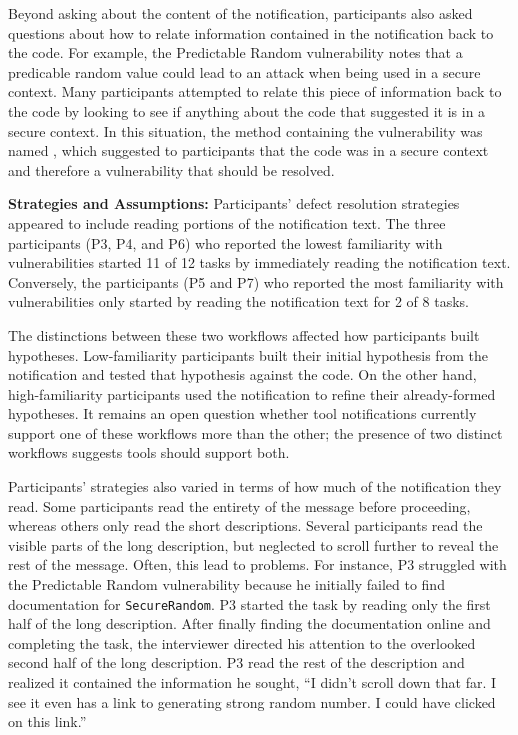 \documentclass[10pt,journal,compsoc]{IEEEtran}
\begin{document}
Beyond asking about the content of the notification, participants also asked questions about how to relate information contained in the notification back to the code. 
For example, the Predictable Random vulnerability notes that a predicable random value could lead to an attack when being used in a secure context. 
Many participants attempted to relate this piece of information back to the code by looking to see if anything about the code that suggested it is in a secure context. 
In this situation, the method containing the vulnerability was named , which suggested to participants that the code was in a secure context and therefore a vulnerability that should be resolved.


\textbf{Strategies and Assumptions:}
Participants' defect resolution strategies appeared to include reading portions of the notification text. 
The three participants (P3, P4, and P6) who reported the lowest familiarity with vulnerabilities 
started 11 of 12 tasks by immediately reading the notification text. 
Conversely, the participants (P5 and P7) who reported the most familiarity with vulnerabilities only started by reading the notification text for 2 of 8 tasks.

The distinctions between these two workflows affected how participants built hypotheses.
Low-familiarity participants built their initial hypothesis from the notification and tested that hypothesis against the code. 
On the other hand, high-familiarity participants used the notification to refine their already-formed hypotheses. 
It remains an open question whether tool notifications currently support one of these workflows more than the other; the presence of two distinct workflows suggests tools should support both. 

Participants' strategies also varied in terms of how much of the notification they read.
Some participants read the entirety of the message before proceeding, whereas others only read the short descriptions. 
Several participants read the visible parts of the long description, but neglected to scroll further to reveal the rest of the message.
Often, this lead to problems. 
For instance, P3 struggled with the Predictable Random vulnerability because he initially failed to find documentation for \texttt{SecureRandom}.
P3 started the task by reading only the first half of the long description.
After finally finding the documentation online and completing the task, the interviewer directed his attention to the overlooked second half of the long description.
P3 read the rest of the description and realized it contained the information he sought,
``I didn't scroll down that far. I see it even has a link to generating strong random number. I could have clicked on this link.'' 
\end{document}
